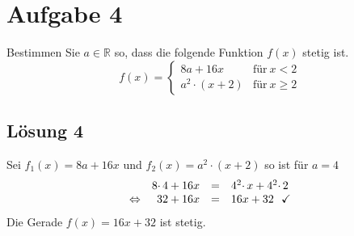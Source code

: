 \section{Aufgabe 4}

Bestimmen Sie $\displaystyle a\in \mathbb{R}$ so, dass die folgende Funktion $\displaystyle f( x)$ stetig ist.
\begin{equation*}
	f( x) =\begin{cases}
		8a+16x & \text{für} \ x< 2\\
		a^{2} \cdotp ( x+2) & \text{für} \ x\geq 2
	\end{cases}
\end{equation*}


\subsection{Lösung 4}
Sei $\displaystyle f_{1}( x) =8a+16x$ und $\displaystyle f_{2}( x) =a^{2} \cdotp ( x+2)$ so ist für $\displaystyle a=4$
\begin{equation*}
	\begin{array}{ c r c l }
		& 8\cdotp 4+16x & = & 4^{2} \cdotp x+4^{2} \cdotp 2\\
		\Leftrightarrow  & 32+16x & = & 16x+32\ \ \checkmark
	\end{array}
\end{equation*}
Die Gerade $\displaystyle f( x) =16x+32$ ist stetig.
